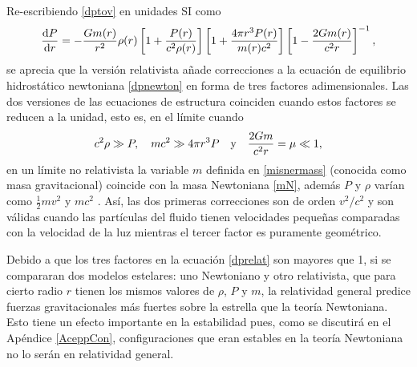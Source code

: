 Re-escribiendo \eqref{dptov} en unidades SI como
\begin{equation}
    \dv{P}{r} =  - \frac { G  m ( r ) } { r ^ { 2 } } \rho ( r ) \left[ 1 + \frac { P ( r ) } {c ^ { 2 } \rho ( r ) } \right] \left[ 1 + \frac { 4 \pi r ^ { 3 } P ( r ) } { m ( r ) c ^ { 2 } } \right]  \left[ 1 - \frac { 2 G m ( r ) } { c ^ { 2 } r } \right] ^ { - 1 }, 
    \label{dprelat}
\end{equation}
se aprecia que la versión relativista añade correcciones a la ecuación de equilibrio hidrostático newtoniana \eqref{dpnewton} en forma de tres factores adimensionales. Las dos versiones de las ecuaciones de estructura coinciden cuando estos factores se reducen a la unidad, esto es, en el límite cuando 
\begin{equation}
    c^2\rho \gg P \qc mc^2 \gg 4\pi r^3P \quad \text{y} \quad  \frac{2Gm}{c^2r}= \mu \ll 1,
\end{equation}
en un límite no relativista la variable $m$ definida en \eqref{misnermass} (conocida como masa gravitacional)  coincide con la masa Newtoniana \eqref{mN}, además $P$ y $\rho$ varían como $\frac{1}{2}mv^2$ y  $mc^2$ \cite{Silbar2003}. Así, las dos primeras correcciones son de orden $v^2/c^2$ y son válidas cuando las partículas del fluido tienen velocidades pequeñas comparadas con la velocidad de la luz mientras el tercer factor es puramente geométrico. 

Debido a que los tres factores en la ecuación \eqref{dprelat} son mayores que 1, si se compararan dos modelos estelares: uno Newtoniano y otro relativista, que para cierto radio $r$ tienen los mismos valores de $\rho$, $P$ y $m$, la relatividad general predice fuerzas gravitacionales más fuertes sobre la estrella que la teoría Newtoniana. Esto tiene un efecto importante en la estabilidad pues, como se discutirá en el Apéndice \ref{AceppCon}, configuraciones que eran estables en la teoría Newtoniana no lo serán en relatividad general. 

